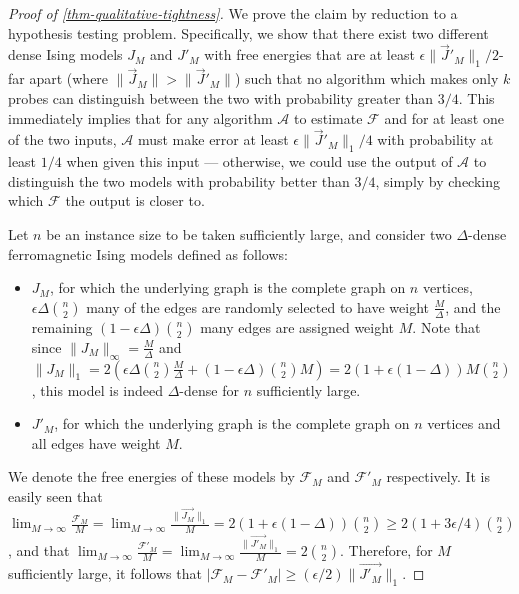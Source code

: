 \documentclass[final, 12pt]{colt2018}
\newcommand{\F}{\mathcal{F}}
\theoremstyle{definition}
\theoremstyle{plain}
\begin{document}
\begin{proof}[Proof of \cref{thm-qualitative-tightness}]
We prove the claim by reduction to a hypothesis testing problem. Specifically, we show that
there exist two different dense Ising models $J_M$ and $J'_M$ with free energies that are at least $\epsilon\|\vec J'_M\|_1/2$-far apart (where $\|\vec J_M\| > \|\vec J'_M\|$) such that no algorithm which makes only $k$ probes can distinguish between the two with probability greater than $3/4$. 
This immediately implies that for any algorithm $\mathcal A$ to estimate $\F$ and for at least one of the two inputs, $\mathcal A$ must make error at least $\epsilon\|\vec J'_M\|_1/4$ with probability at least $1/4$ when given this input ---
otherwise, we could use the output of $\mathcal A$ to distinguish the two models with probability better
than $3/4$, simply by checking which $\F$ the output is closer to.

Let $n$ be an instance size to be taken sufficiently large, and consider two $\Delta$-dense ferromagnetic Ising models defined
as follows: 
\begin{itemize}
\item $J_{M}$, for which the underlying graph is the complete graph on
$n$ vertices, $\epsilon\Delta {n \choose 2}$ many of the edges are randomly selected
to have weight $\frac{M}{\Delta}$, and the remaining $(1-\epsilon \Delta){n \choose 2}$ many
 edges are assigned weight $M$. Note that since $\|J_{M}\|_{\infty}=\frac{M}{\Delta}$
and $\|J_{M}\|_{1}=2(\epsilon \Delta {n \choose 2}\frac{M}{\Delta}+(1-\epsilon \Delta){n \choose 2}M) = 2(1 + \epsilon(1 - \Delta)) M {n \choose 2}$,
this model is indeed $\Delta$-dense for $n$ sufficiently large. 
\item $J'_{M}$, for which the underlying graph is the complete graph on
$n$ vertices and all edges have weight $M$. 
\end{itemize}
We denote the free energies of these models by $\F_{M}$ and
$\F'_{M}$ respectively. It is easily seen that $\lim_{M\rightarrow\infty}\frac{\F_{M}}{M}=\lim_{M\rightarrow\infty}\frac{\|\vec{J_{M}}\|_{1}}{M}=2(1 + \epsilon(1 - \Delta)){n \choose 2} \ge 2(1 + 3\epsilon/4){n \choose 2}$,
and that $\lim_{M\rightarrow\infty}\frac{\F'_{M}}{M}=\lim_{M\rightarrow\infty}\frac{\|\vec{J'_{M}}\|_{1}}{M}=2{n \choose 2}$.
Therefore, for $M$ sufficiently large, it follows that %
$|\F_M - \F'_M| \ge %
(\epsilon/2) \|\vec{J'_M}\|_1$.


\end{proof}
\end{document}
